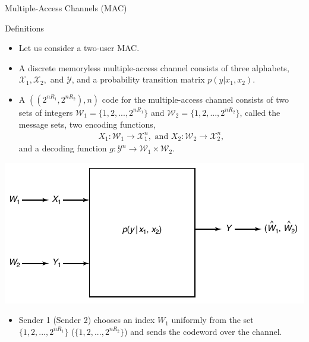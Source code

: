 \documentclass{beamer}
\begin{document}
{\begin{frame}{Multiple-Access Channels (MAC)}
\begin{itemize}
	\end{itemize}
\end{frame}
\begin{frame}{Definitions} 

 \begin{itemize}
	\justifying
\item<1-> Let us consider a two-user MAC.
\item<2-> {\color{red}A discrete memoryless multiple-access channel} consists of three alphabets, $\mathcal{X}_1, \mathcal{X}_2,$ and $\mathcal{Y}$, and a probability transition matrix $p(y|x_1,x_2)$.
%
\item<3-> {\color{red} A $((2^{nR_1},2^{nR_2}),n)$ code} for the multiple-access channel consists of two sets of integers $\mathcal{W}_1 = \{1,2,...,2^{nR_1} \}$ and $\mathcal{W}_2 = \{1,2,...,2^{nR_2} \}$, called the message sets, two encoding functions,
%
\begin{eqnarray*}
    X_1: \mathcal{W}_1 \rightarrow \mathcal{X}_1^n, \text{ and } X_2: \mathcal{W}_2 \rightarrow \mathcal{X}_2^n,
\end{eqnarray*}
%
and a decoding function $g: \mathcal{Y}^n \rightarrow \mathcal{W}_1 \times \mathcal{W}_2.$  
	\end{itemize}
\end{frame}
\begin{frame}%
\begin{center}
\includegraphics[scale=0.35]{Diagrams/MAC.png}    
\end{center}
%
 \begin{itemize}
	\justifying

\item<1-> Sender 1 (Sender 2) chooses an index $W_1$ uniformly from the set $\{1,2,...,2^{nR_1}\}$ ($\{1,2,...,2^{nR_2}\}$) and sends the codeword over the channel. 


\end{itemize}
\end{frame}}
\end{document}
